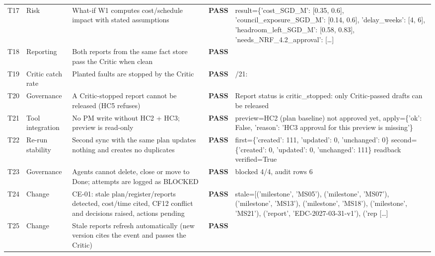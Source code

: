 {\begin{longtable}{@{}>{\raggedright\arraybackslash}p{0.75cm}>{\raggedright\arraybackslash}p{1.9cm}>{\raggedright\arraybackslash}p{4.2cm}>{\raggedright\arraybackslash}p{1.0cm}>{\raggedright\arraybackslash}p{6.9cm}@{}}
T17 & Risk & What-if W1 computes cost/schedule impact with stated assumptions & \textbf{PASS} & {\ttfamily result=\allowbreak{}\{'cost\_SGD\_M': [0.35,\allowbreak{} 0.6],\allowbreak{} 'council\_exposure\_SGD\_M': [0.14,\allowbreak{} 0.6],\allowbreak{} 'delay\_weeks': [4,\allowbreak{} 6],\allowbreak{} 'headroom\_left\_SGD\_M': [0.58,\allowbreak{} 0.83],\allowbreak{} 'needs\_NRF\_4.2\_approval': } [\ldots] \\
T18 & Reporting & Both reports from the same fact store pass the Critic when clean & \textbf{PASS} & {} \\
T19 & Critic catch rate & Planted faults are stopped by the Critic & \textbf{PASS} & {\ttfamily 21/\allowbreak{}21: } \\
T20 & Governance & A Critic-stopped report cannot be released (HC5 refuses) & \textbf{PASS} & {\ttfamily Report status is critic\_stopped: only Critic-passed drafts can be released} \\
T21 & Tool integration & No PM write without HC2 + HC3; preview is read-only & \textbf{PASS} & {\ttfamily preview=\allowbreak{}HC2 (plan baseline) not approved yet,\allowbreak{} apply=\allowbreak{}\{'ok': False,\allowbreak{} 'reason': 'HC3 approval for this preview is missing'\}} \\
T22 & Re-run stability & Second sync with the same plan updates nothing and creates no duplicates & \textbf{PASS} & {\ttfamily first=\allowbreak{}\{'created': 111,\allowbreak{} 'updated': 0,\allowbreak{} 'unchanged': 0\} second=\allowbreak{}\{'created': 0,\allowbreak{} 'updated': 0,\allowbreak{} 'unchanged': 111\} readback verified=\allowbreak{}True} \\
T23 & Governance & Agents cannot delete, close or move to Done; attempts are logged as BLOCKED & \textbf{PASS} & {\ttfamily blocked 4/\allowbreak{}4,\allowbreak{} audit rows 6} \\
T24 & Change & CE-01: stale plan/register/reports detected, cost/time cited, CF12 conflict and decisions raised, actions pending & \textbf{PASS} & {\ttfamily stale=\allowbreak{}[('milestone',\allowbreak{} 'MS05'),\allowbreak{} ('milestone',\allowbreak{} 'MS07'),\allowbreak{} ('milestone',\allowbreak{} 'MS13'),\allowbreak{} ('milestone',\allowbreak{} 'MS18'),\allowbreak{} ('milestone',\allowbreak{} 'MS21'),\allowbreak{} ('report',\allowbreak{} 'EDC-2027-03-31-v1'),\allowbreak{} ('rep} [\ldots] \\
T25 & Change & Stale reports refresh automatically (new version cites the event and passes the Critic) & \textbf{PASS} & {} \\

\end{longtable}}
